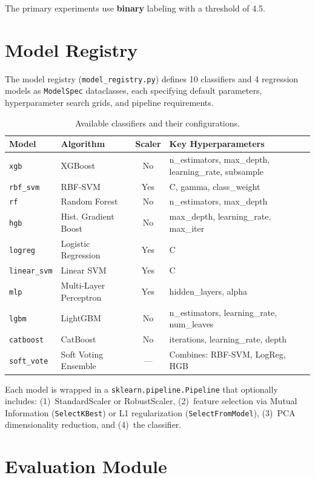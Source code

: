 \documentclass[12pt,a4paper]{report}
\begin{document}
The primary experiments use \textbf{binary} labeling with a threshold of 4.5.


\section{Model Registry}
\label{sec:models}

The model registry (\texttt{model\_registry.py}) defines 10 classifiers and 4
regression models as \texttt{ModelSpec} dataclasses, each specifying default
parameters, hyperparameter search grids, and pipeline requirements.

\begin{table}[H]
\centering
\caption{Available classifiers and their configurations.}
\label{tab:models}
\begin{tabular}{llcp{4.5cm}}
\toprule
\textbf{Model} & \textbf{Algorithm} & \textbf{Scaler} & \textbf{Key Hyperparameters} \\
\midrule
\texttt{xgb} & XGBoost & No & n\_estimators, max\_depth, learning\_rate, subsample \\
\texttt{rbf\_svm} & RBF-SVM & Yes & C, gamma, class\_weight \\
\texttt{rf} & Random Forest & No & n\_estimators, max\_depth \\
\texttt{hgb} & Hist. Gradient Boost & No & max\_depth, learning\_rate, max\_iter \\
\texttt{logreg} & Logistic Regression & Yes & C \\
\texttt{linear\_svm} & Linear SVM & Yes & C \\
\texttt{mlp} & Multi-Layer Perceptron & Yes & hidden\_layers, alpha \\
\texttt{lgbm} & LightGBM & No & n\_estimators, learning\_rate, num\_leaves \\
\texttt{catboost} & CatBoost & No & iterations, learning\_rate, depth \\
\texttt{soft\_vote} & Soft Voting Ensemble & --- & Combines: RBF-SVM, LogReg, HGB \\
\bottomrule
\end{tabular}
\end{table}

Each model is wrapped in a \texttt{sklearn.pipeline.Pipeline} that optionally
includes: (1)~StandardScaler or RobustScaler, (2)~feature selection via Mutual
Information (\texttt{SelectKBest}) or L1 regularization (\texttt{SelectFromModel}),
(3)~PCA dimensionality reduction, and (4)~the classifier.


\section{Evaluation Module}
\label{sec:eval}
\end{document}
